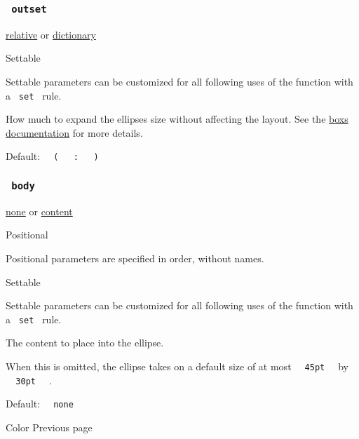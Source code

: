 \subsubsection{\texorpdfstring{\texttt{\ outset\ }}{ outset }}\label{parameters-outset}

\href{/docs/reference/layout/relative/}{relative} {or}
\href{/docs/reference/foundations/dictionary/}{dictionary}

{{ Settable }}

\label{parameters-outset-settable-tooltip}
Settable parameters can be customized for all following uses of the
function with a \texttt{\ set\ } rule.

How much to expand the ellipse\textquotesingle s size without affecting
the layout. See the
\href{/docs/reference/layout/box/\#parameters-outset}{box\textquotesingle s
documentation} for more details.

Default:
\texttt{\ }{\texttt{\ (\ }}\texttt{\ }{\texttt{\ :\ }}\texttt{\ }{\texttt{\ )\ }}\texttt{\ }

\subsubsection{\texorpdfstring{\texttt{\ body\ }}{ body }}\label{parameters-body}

\href{/docs/reference/foundations/none/}{none} {or}
\href{/docs/reference/foundations/content/}{content}

{{ Positional }}

\label{parameters-body-positional-tooltip}
Positional parameters are specified in order, without names.

{{ Settable }}

\label{parameters-body-settable-tooltip}
Settable parameters can be customized for all following uses of the
function with a \texttt{\ set\ } rule.

The content to place into the ellipse.

When this is omitted, the ellipse takes on a default size of at most
\texttt{\ }{\texttt{\ 45pt\ }}\texttt{\ } by
\texttt{\ }{\texttt{\ 30pt\ }}\texttt{\ } .

Default: \texttt{\ }{\texttt{\ none\ }}\texttt{\ }

\href{/docs/reference/visualize/color/}{\pandocbounded{}}

{ Color } { Previous page }

\href{/docs/reference/visualize/gradient/}{\pandocbounded{}}

